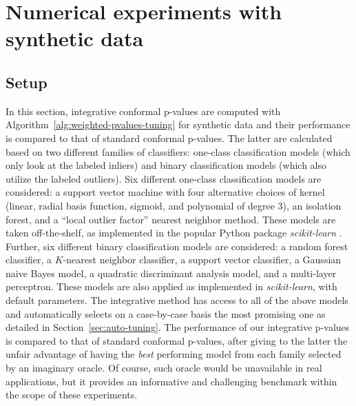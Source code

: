 \documentclass[11pt]{article}
\begin{document}
\section{Numerical experiments with synthetic data} \label{sec:exp-synthetic}

\subsection{Setup} \label{sec:exp-setup}

In this section, integrative conformal p-values are computed with Algorithm~\ref{alg:weighted-pvalues-tuning} for synthetic data and their performance is compared to that of standard conformal p-values.
The latter are calculated based on two different families of classifiers: one-class classification models (which only look at the labeled inliers) and binary classification models (which also utilize the labeled outliers).
Six different one-class classification models are considered: a support vector machine with four alternative choices of kernel (linear, radial basis function, sigmoid, and polynomial of degree 3), an isolation forest, and a ``local outlier factor'' nearest neighbor method. These models are taken off-the-shelf, as implemented in the popular Python package {\em scikit-learn} \cite{scikit-learn}.
Further, six different binary classification models are considered: a random forest classifier, a $K$-nearest neighbor classifier, a support vector classifier, a Gaussian naive Bayes model, a quadratic discriminant analysis model, and a multi-layer perceptron. These models are also applied as implemented in {\em scikit-learn}, with default parameters.
The integrative method has access to all of the above models and automatically selects on a case-by-case basis the most promising one as detailed in Section~\ref{sec:auto-tuning}. The performance of our integrative p-values is compared to that of standard conformal p-values, after giving to the latter the unfair advantage of having the {\em best} performing model from each family selected by an imaginary oracle. 
Of course, such oracle would be unavailable in real applications, but it provides an informative and challenging benchmark within the scope of these experiments.
\end{document}
